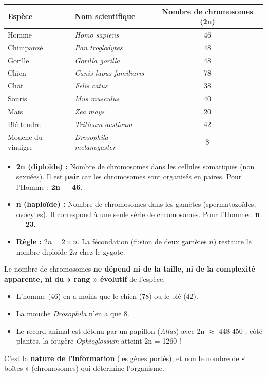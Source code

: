\documentclass[11pt]{article}
\begin{document}
\begin{center}
\begin{tabularx}{\linewidth}{|l|X|c|}\hline
\rowcolor{popblueL}
\textbf{Espèce} & \textbf{Nom scientifique} & \textbf{Nombre de chromosomes (2n)} \\ \hline
Homme & \emph{Homo sapiens} & 46 \\ \hline
Chimpanzé & \emph{Pan troglodytes} & 48 \\ \hline
Gorille & \emph{Gorilla gorilla} & 48 \\ \hline
Chien & \emph{Canis lupus familiaris} & 78 \\ \hline
Chat & \emph{Felis catus} & 38 \\ \hline
Souris & \emph{Mus musculus} & 40 \\ \hline
Maïs & \emph{Zea mays} & 20 \\ \hline
Blé tendre & \emph{Triticum aestivum} & 42 \\ \hline
Mouche du vinaigre & \emph{Drosophila melanogaster} & 8 \\ \hline
\end{tabularx}
\end{center}

\begin{aretenir}
\begin{itemize}
    \item \textbf{2n (diploïde) :} Nombre de chromosomes dans les cellules somatiques (non sexuées). Il est \textbf{pair} car les chromosomes sont organisés en paires. Pour l'Homme : \textbf{2n = 46}.
    \item \textbf{n (haploïde) :} Nombre de chromosomes dans les gamètes (spermatozoïdes, ovocytes). Il correspond à une seule série de chromosomes. Pour l'Homme : \textbf{n = 23}.
    \item \textbf{Règle :} $2n = 2 \times n$. La fécondation (fusion de deux gamètes $n$) restaure le nombre diploïde $2n$ chez le zygote.
\end{itemize}
\end{aretenir}

\begin{attention}
Le nombre de chromosomes \textbf{ne dépend ni de la taille, ni de la complexité apparente, ni du « rang » évolutif} de l'espèce.
\begin{itemize}
    \item L'homme (46) en a moins que le chien (78) ou le blé (42).
    \item La mouche \emph{Drosophila} n'en a que 8.
    \item Le record animal est détenu par un papillon (\emph{Atlas}) avec 2n $\approx$ 448-450 ; côté plantes, la fougère \emph{Ophioglossum} atteint 2n = 1260 !
\end{itemize}
C'est la \textbf{nature de l'information} (les gènes portés), et non le nombre de « boîtes » (chromosomes) qui détermine l'organisme.
\end{attention}
\end{document}
